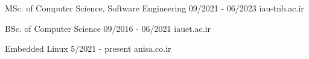 \documentclass[a4paper,12pt]{memoir} %
\begin{document}

\clearpage %

\userinformation %

\framebreak %






{MSc. of Computer Science, Software Engineering}
{09/2021 - 06/2023}
{}
{iau-tnb.ac.ir}

{BSc. of Computer Science}
{09/2016 - 06/2021}
{}
{iauet.ac.ir}


\Sep %







{Embedded Linux}
{5/2021 - present}
{}
{anisa.co.ir}
\end{document}
